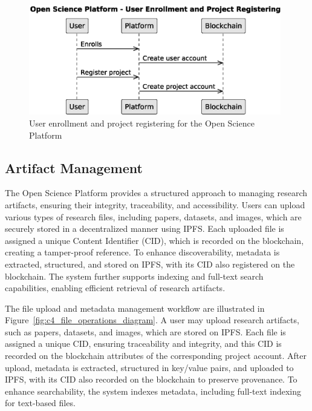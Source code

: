 \documentclass{article}
\begin{document}
\begin{figure}[htbp]
      \centering
      \includegraphics[width=0.98\textwidth, keepaspectratio]{c4_platform_operations_1.eps}
      \caption{User enrollment and project registering for the Open Science Platform}
      \label{fig:c4_operations_1}
\end{figure}

\subsection{Artifact Management}

The Open Science Platform provides a structured approach to managing research artifacts, ensuring their integrity, traceability, and accessibility. Users can upload various types of research files, including papers, datasets, and images, which are securely stored in a decentralized manner using IPFS. Each uploaded file is assigned a unique Content Identifier (CID), which is recorded on the blockchain, creating a tamper-proof reference. To enhance discoverability, metadata is extracted, structured, and stored on IPFS, with its CID also registered on the blockchain. The system further supports indexing and full-text search capabilities, enabling efficient retrieval of research artifacts.

The file upload and metadata management workflow are illustrated in Figure~\ref{fig:c4_file_operations_diagram}. A user may upload research artifacts, such as papers, datasets, and images, which are stored on IPFS. Each file is assigned a unique CID, ensuring traceability and integrity, and this CID is recorded on the blockchain attributes of the corresponding project account. After upload, metadata is extracted, structured in key/value pairs, and uploaded to IPFS, with its CID also recorded on the blockchain to preserve provenance. To enhance searchability, the system indexes metadata, including full-text indexing for text-based files.
\end{document}
